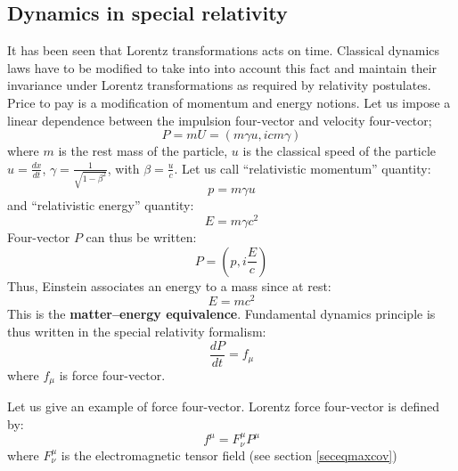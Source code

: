\documentclass[12pt]{book}
\begin{document}
\subsection{Dynamics in special relativity}\label{secdynasperel}
It has been seen that Lorentz transformations acts on time. Classical dynamics
laws have to be modified to take into into account this fact and maintain
their invariance under Lorentz transformations as required by relativity
postulates. Price to pay is a modification of momentum and energy notions.
Let us impose a linear dependence between the impulsion four-vector and
velocity four-vector;
\begin{equation}
P=mU=(m\gamma u,icm\gamma)
\end{equation}
where $m$ is the rest mass of the particle, $u$ is the classical speed
of the particle $u=\frac{dx}{dt}$,
$\gamma=\frac{1}{\sqrt{1-\beta^2}}$, with $\beta=\frac{u}{c}$. Let us
call ``relativistic 
momentum'' quantity:
\begin{equation}
p=m \gamma u
\end{equation}
and ``relativistic energy'' quantity:
\begin{equation}
E=m\gamma c^2
\end{equation}
Four-vector $P$ can thus be written:
\begin{equation}
P=(p,i\frac{E}{c})
\end{equation}
Thus, Einstein associates an energy to a mass since at rest: 
\begin{equation}
E=mc^2
\end{equation}
This is the {\bf matter--energy equivalence}.
Fundamental dynamics principle is thus written in the special relativity
formalism:
\begin{equation}
\frac{dP}{dt}=f_\mu
\end{equation}
where $f_\mu$ is force four-vector.
\begin{exmp}
Let us give an example of force four-vector. Lorentz force four-vector is
defined by:
\begin{equation}
f^\mu=F^\mu_\nu P^\mu
\end{equation}
where $F^\mu_\nu$ is the electromagnetic tensor field  (see section
\ref{seceqmaxcov}) 
\end{exmp}
\end{document}
